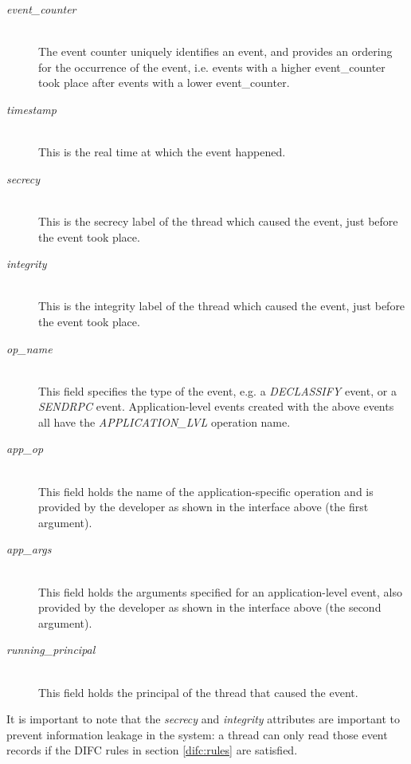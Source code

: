 \begin{description}
  \item[\emph{event\_counter}] \ \\
    The event counter uniquely identifies an event, and provides an
    ordering for the occurrence of the event, i.e. events with a higher 
    event\_counter took place after events with a lower event\_counter.
  \item[\emph{timestamp}] \ \\
    This is the real time at which the event happened.
  \item[\emph{secrecy}] \ \\
    This is the secrecy label of the thread which caused the event, 
    just before the event took place.
  \item[\emph{integrity}] \ \\
    This is the integrity label of the thread which caused the event, 
    just before the event took place.
  \item[\emph{op\_name}] \ \\
    This field specifies the type of the event, 
    e.g. a \emph{DECLASSIFY} event, 
    or a \emph{SENDRPC} event.
    Application-level events created with the above events
    all have the \emph{APPLICATION\_LVL} operation name.
  \item[\emph{app\_op}] \ \\
    This field holds the name of the 
    application-specific operation and is 
    provided by the developer as shown in the interface
    above (the first argument).
  \item[\emph{app\_args}] \ \\
    This field holds the arguments specified for an application-level 
    event, also provided by the developer 
    as shown in the interface above (the second argument).
  \item[\emph{running\_principal}] \ \\
    This field holds the principal of the thread that caused the event.
\end{description}

It is important to note that the \emph{secrecy} and \emph{integrity} attributes are important to prevent information leakage in the system: a thread can only read those event records if the DIFC rules in section \ref{difc:rules} are satisfied.


